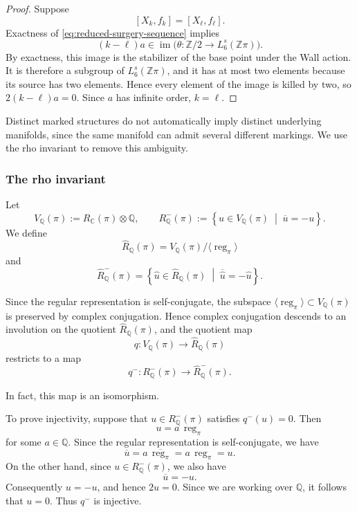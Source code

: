 \documentclass[10pt,reqno]{amsart}
\numberwithin{equation}{section}
\theoremstyle{definition}
\theoremstyle{remark}
\newcommand{\Z}{\mathbb Z}
\newcommand{\Q}{\mathbb Q}
\newcommand{\C}{\mathbb C}
\newcommand{\im}{\operatorname{im}}
\begin{document}
\begin{proof}
Suppose
\[
[X_k,f_k]=[X_\ell,f_\ell].
\]
Exactness of \eqref{eq:reduced-surgery-sequence} implies
\[
(k-\ell)a\in\im\bigl(
\theta\colon\Z/2\to L_6^s(\Z\pi)
\bigr).
\]
By exactness, this image is the stabilizer of the base point under the
Wall action.  It is therefore a subgroup of \(L_6^s(\Z\pi)\), and it
has at most two elements because its source has two elements.  Hence
every element of the image is killed by two, so
\(2(k-\ell)a=0\).  Since \(a\) has infinite order, \(k=\ell\).
\end{proof}

Distinct marked structures do not automatically imply distinct
underlying manifolds, since the same manifold can admit several
different markings.  We use the rho invariant to remove this
ambiguity.

\subsubsection{The rho invariant}

Let
\[
V_{\Q}(\pi):=R_{\C}(\pi)\otimes\Q,
\qquad
R^-_{\Q}(\pi)
:=
\left\{
u\in V_{\Q}(\pi)
\;\middle|\;
\overline{u}=-u
\right\}.
\]
We define
\[
\widehat R_{\Q}(\pi)
=
V_{\Q}(\pi)/\langle\operatorname{reg}_{\pi}\rangle
\]
and
\[
\widehat R^-_{\Q}(\pi)
=
\left\{
\widehat u\in\widehat R_{\Q}(\pi)
\;\middle|\;
\overline{\widehat u}=-\widehat u
\right\}.
\]

Since the regular representation is self-conjugate,
the subspace
\(\langle\operatorname{reg}_{\pi}\rangle\subset V_{\Q}(\pi)\)
is preserved by complex conjugation. Hence complex conjugation descends
to an involution on the quotient \(\widehat R_{\Q}(\pi)\), and the
quotient map
\[
q\colon V_{\Q}(\pi)\longrightarrow \widehat R_{\Q}(\pi)
\]
restricts to a map
\[
q^-\colon R^-_{\Q}(\pi)\longrightarrow
\widehat R^-_{\Q}(\pi).
\]

In fact, this map is an isomorphism.

To prove injectivity, suppose that \(u\in R^-_{\Q}(\pi)\) satisfies
\(q^-(u)=0\). Then
\[
u=a\,\operatorname{reg}_{\pi}
\]
for some \(a\in\Q\). Since the regular representation is
self-conjugate, we have
\[
\overline u
=
a\,\overline{\operatorname{reg}_{\pi}}
=
a\,\operatorname{reg}_{\pi}
=
u.
\]
On the other hand, since \(u\in R^-_{\Q}(\pi)\), we also have
\[
\overline u=-u.
\]
Consequently \(u=-u\), and hence \(2u=0\). Since we are working over
\(\Q\), it follows that \(u=0\). Thus \(q^-\) is injective.
\end{document}
